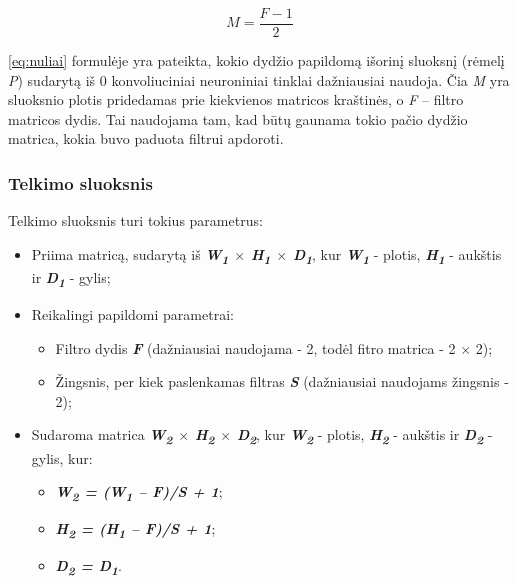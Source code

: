 \documentclass{VUMIFInfKursinis}
\begin{document}
\begin{equation}\label{eq:nuliai}
M=\frac{F-1}{2}
\end{equation}

\ref{eq:nuliai} formulėje yra pateikta, kokio dydžio papildomą išorinį sluoksnį (rėmelį \textit{P}) sudarytą iš 0 konvoliuciniai neuroniniai tinklai dažniausiai naudoja. Čia \textit{M} yra sluoksnio plotis pridedamas prie kiekvienos matricos kraštinės, o \textit{F} – filtro matricos dydis. Tai naudojama tam, kad būtų gaunama tokio pačio dydžio matrica, kokia buvo paduota filtrui apdoroti.


\subsubsection{Telkimo sluoksnis}

Telkimo sluoksnis turi tokius parametrus:
\begin{itemize}
	\item Priima matricą, sudarytą iš \textit{\textbf{W\textsubscript{1} $\times$ H\textsubscript{1} $\times$ D\textsubscript{1}}}, kur \textit{\textbf{W\textsubscript{1}}} - plotis, \textit{\textbf{H\textsubscript{1}}} - aukštis ir \textit{\textbf{D\textsubscript{1}}} - gylis;
	\item Reikalingi papildomi parametrai:
	\begin{itemize}
		\item Filtro dydis \textbf{\textit{F}} (dažniausiai naudojama - 2, todėl fitro matrica - 2 $\times$ 2);
		\item Žingsnis, per kiek paslenkamas filtras \textbf{\textit{S}} (dažniausiai naudojams žingsnis - 2);
	\end{itemize}
	\item Sudaroma matrica \textit{\textbf{W\textsubscript{2} $\times$ H\textsubscript{2} $\times$ D\textsubscript{2}}}, kur \textit{\textbf{W\textsubscript{2}}} - plotis, \textit{\textbf{H\textsubscript{2}}} - aukštis ir \textit{\textbf{D\textsubscript{2}}} - gylis, kur:
	\begin{itemize}
		\item \textit{\textbf{W\textsubscript{2} = (W\textsubscript{1} – F)/S + 1}};
		\item \textit{\textbf{H\textsubscript{2} = (H\textsubscript{1} – F)/S + 1}};
		\item \textit{\textbf{D\textsubscript{2} = D\textsubscript{1}}}.
	\end{itemize}
\end{itemize}
\end{document}
